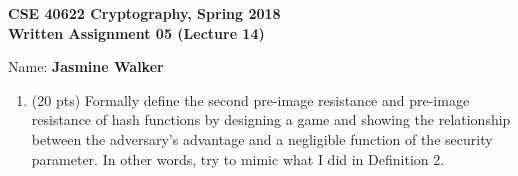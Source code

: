 \documentclass[10pt]{article}
\begin{document}






\begin{center}
	\textbf{CSE 40622 Cryptography, Spring 2018\\Written Assignment 05 (Lecture 14)}
\end{center}


Name: \textbf{Jasmine Walker}






\begin{enumerate}
	
	\item (20 pts) Formally define the second pre-image resistance and pre-image resistance of hash functions by
	designing a game and showing the relationship between the adversary's advantage and a negligible function
	of the security parameter. In other words, try to mimic what I did in Definition 2.
	

\end{enumerate}
\end{document}
